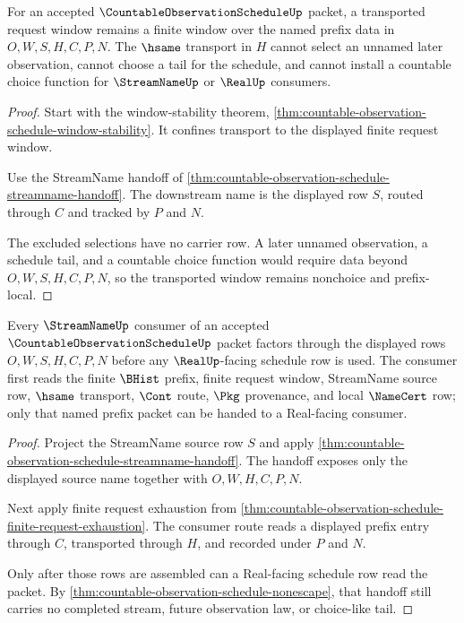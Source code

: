 \begin{theorem}
\label{thm:countable-observation-schedule-prefix-window-nonchoice}
For an accepted $\CountableObservationScheduleUp$ packet, a transported request window remains a finite window over the named prefix data in $O,W,S,H,C,P,N$. The $\hsame$ transport in $H$ cannot select an unnamed later observation, cannot choose a tail for the schedule, and cannot install a countable choice function for $\StreamNameUp$ or $\RealUp$ consumers.
\end{theorem}
\begin{proof}
Start with the window-stability theorem, \autoref{thm:countable-observation-schedule-window-stability}. It confines transport to the displayed finite request window.

Use the StreamName handoff of \autoref{thm:countable-observation-schedule-streamname-handoff}. The downstream name is the displayed row $S$, routed through $C$ and tracked by $P$ and $N$.

The excluded selections have no carrier row. A later unnamed observation, a schedule tail, and a countable choice function would require data beyond $O,W,S,H,C,P,N$, so the transported window remains nonchoice and prefix-local.
\end{proof}

\begin{theorem}
\label{thm:countable-observation-schedule-streamname-prefix-consumer}
Every $\StreamNameUp$ consumer of an accepted $\CountableObservationScheduleUp$ packet factors through the displayed rows $O,W,S,H,C,P,N$ before any $\RealUp$-facing schedule row is used. The consumer first reads the finite $\BHist$ prefix, finite request window, StreamName source row, $\hsame$ transport, $\Cont$ route, $\Pkg$ provenance, and local $\NameCert$ row; only that named prefix packet can be handed to a Real-facing consumer.
\end{theorem}
\begin{proof}
Project the StreamName source row $S$ and apply \autoref{thm:countable-observation-schedule-streamname-handoff}. The handoff exposes only the displayed source name together with $O,W,H,C,P,N$.

Next apply finite request exhaustion from \autoref{thm:countable-observation-schedule-finite-request-exhaustion}. The consumer route reads a displayed prefix entry through $C$, transported through $H$, and recorded under $P$ and $N$.

Only after those rows are assembled can a Real-facing schedule row read the packet. By \autoref{thm:countable-observation-schedule-nonescape}, that handoff still carries no completed stream, future observation law, or choice-like tail.
\end{proof}

